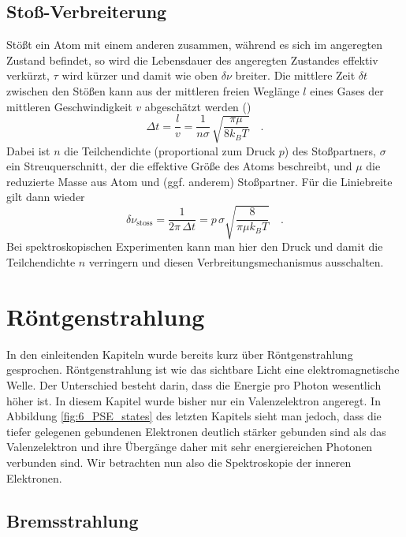 \subsection{Stoß-Verbreiterung}

Stößt ein Atom mit einem anderen zusammen, während es sich im angeregten Zustand befindet, so wird die Lebensdauer des angeregten Zustandes effektiv verkürzt, $\tau$ wird kürzer und damit wie oben $\delta \nu$ breiter. Die mittlere Zeit $\delta t$ zwischen den Stößen kann aus der mittleren freien Weglänge $l$ eines Gases der mittleren Geschwindigkeit $v$ abgeschätzt werden (\cite{Demtroeder_laser}) %
\begin{equation}
    \Delta t = \frac{l}{v} = \frac{1}{n \sigma} \, \sqrt{ \frac{\pi \mu}{8 k_B T}} \quad .
\end{equation}
Dabei ist $n$ die Teilchendichte (proportional zum Druck $p$) des Stoßpartners, $\sigma$ ein Streuquerschnitt, der die effektive Größe des Atoms beschreibt, und $\mu$ die reduzierte  Masse aus Atom und (ggf. anderem) Stoßpartner. Für die Liniebreite gilt dann wieder
\begin{equation}
    \delta \nu_\text{stoss} = \frac{1}{2\pi \, \Delta t} = p \, \sigma \sqrt{ \frac{8}{\pi \mu k_B T}} \quad .
\end{equation}
Bei spektroskopischen Experimenten kann man hier den Druck und damit die Teilchendichte $n$ verringern und diesen Verbreitungsmechanismus ausschalten. 



\section{Röntgenstrahlung}

In den einleitenden Kapiteln wurde bereits kurz über Röntgenstrahlung gesprochen. Röntgenstrahlung ist wie das sichtbare Licht eine elektromagnetische Welle. Der Unterschied besteht darin, dass die Energie pro Photon wesentlich höher ist. In diesem Kapitel wurde bisher nur ein Valenzelektron angeregt. In Abbildung \ref{fig:6_PSE_states} des letzten Kapitels sieht man jedoch, dass die tiefer gelegenen gebundenen Elektronen deutlich stärker gebunden sind als das Valenzelektron und ihre Übergänge daher mit sehr energiereichen Photonen verbunden sind. Wir betrachten nun also die Spektroskopie der inneren Elektronen.

\subsection{Bremsstrahlung}


